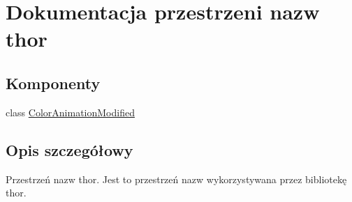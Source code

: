 \hypertarget{namespacethor}{}\section{Dokumentacja przestrzeni nazw thor}
\label{namespacethor}
\subsection*{Komponenty}
\begin{DoxyCompactItemize}
\item 
class \mbox{\hyperlink{classthor_1_1_color_animation_modified}{Color\+Animation\+Modified}}
\end{DoxyCompactItemize}


\subsection{Opis szczegółowy}
Przestrzeń nazw thor. Jest to przestrzeń nazw wykorzystywana przez bibliotekę thor. 